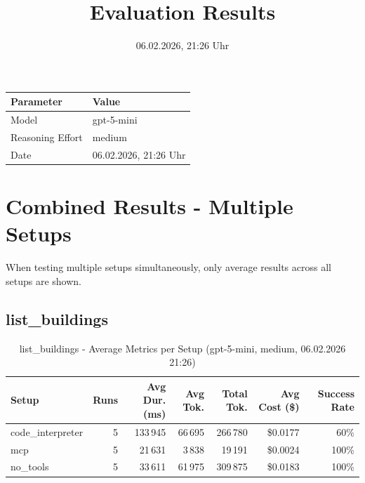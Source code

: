 \documentclass[a4paper,11pt]{article}
\title{Evaluation Results}
\date{06.02.2026, 21:26 Uhr}
\begin{document}
\maketitle

\begin{table}[H]
\centering
\begin{tabular}{l l}
\toprule
\textbf{Parameter} & \textbf{Value} \\
\midrule
Model & gpt-5-mini \\
Reasoning Effort & medium \\
Date & 06.02.2026, 21:26 Uhr \\
\bottomrule
\end{tabular}
\end{table}

\tableofcontents
\clearpage

\section{Combined Results - Multiple Setups}

When testing multiple setups simultaneously, only average results across all setups are shown.

\subsection{list\_buildings}

\begin{table}[H]
\centering
\scriptsize
\caption{list\_buildings - Average Metrics per Setup (gpt-5-mini, medium, 06.02.2026 21:26)}
\label{tab:combined\_list\_buildings\_metrics\_20260206}
\begin{tabular}{l r r r r r r}
\toprule
Setup & Runs & Avg Dur. (ms) & Avg Tok. & Total Tok. & Avg Cost (\$) & Success Rate \\
\midrule
code\_interpreter & 5 & 133\,945 & 66\,695 & 266\,780 & \$0.0177 & 60\% \\
mcp & 5 & 21\,631 & 3\,838 & 19\,191 & \$0.0024 & 100\% \\
no\_tools & 5 & 33\,611 & 61\,975 & 309\,875 & \$0.0183 & 100\% \\
\bottomrule
\end{tabular}
\end{table}
\end{document}
